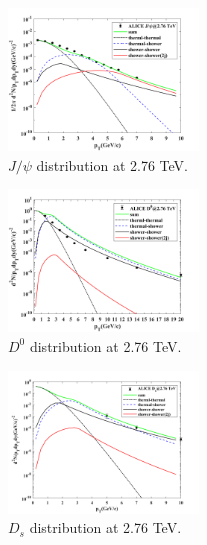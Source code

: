 \documentclass[twocolumn,aps,superscriptaddress,nofootinbib,floatfix]{revtex4}
\begin{document}
\begin{figure}[H]
	\includegraphics[width=0.45\textwidth]{Jpsi276_FONLL.png}
	\caption{$J/\psi$ distribution at 2.76 TeV. }
	\label{fig27}
\end{figure}
\begin{figure}[H]
	\includegraphics[width=0.45\textwidth]{D0276_FONLL.png}
	\caption{$D^0$ distribution at 2.76 TeV. }
	\label{fig28}
\end{figure}
\begin{figure}[H]
	\includegraphics[width=0.45\textwidth]{Ds276_FONLL.png}
	\caption{$D_s$ distribution at 2.76 TeV. }
	\label{fig29}
\end{figure}
\end{document}
